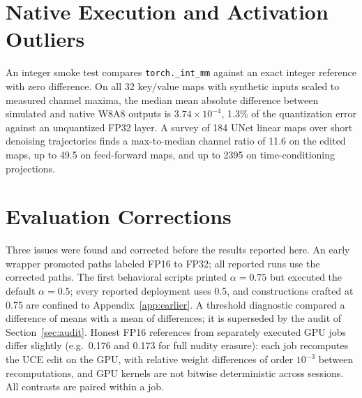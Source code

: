 \documentclass[conference]{IEEEtran}
\begin{document}
\section{Native Execution and Activation Outliers}
\label{app:native}
An integer smoke test compares \texttt{torch.\_int\_mm} against an exact integer
reference with zero difference. On all 32 key/value maps with synthetic inputs scaled
to measured channel maxima, the median mean absolute difference between simulated and
native W8A8 outputs is $3.74\times10^{-4}$, 1.3\% of the quantization error against an
unquantized FP32 layer. A survey of 184 UNet linear maps over short denoising
trajectories finds a max-to-median channel ratio of 11.6 on the edited maps, up to
49.5 on feed-forward maps, and up to 2395 on time-conditioning projections.

\section{Evaluation Corrections}
\label{app:corrections}
Three issues were found and corrected before the results reported here. An early
wrapper promoted paths labeled FP16 to FP32; all reported runs use the corrected
paths. The first behavioral scripts printed $\alpha=0.75$ but executed the default
$\alpha=0.5$; every reported deployment uses 0.5, and constructions crafted at 0.75
are confined to Appendix~\ref{app:earlier}. A threshold diagnostic compared a
difference of means with a mean of differences; it is superseded by the audit of
Section~\ref{sec:audit}. Honest FP16 references from separately executed GPU jobs
differ slightly (e.g.\ 0.176 and 0.173 for full nudity erasure): each job recomputes
the UCE edit on the GPU, with relative weight differences of order $10^{-3}$ between
recomputations, and GPU kernels are not bitwise deterministic across sessions. All
contrasts are paired within a job.
\end{document}
